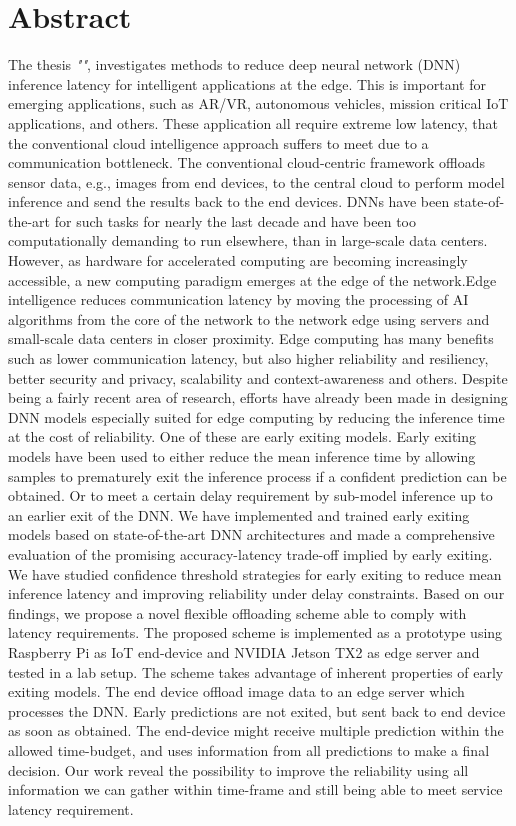 
    \hypertarget{abstract}{%
    \chapter*{Abstract}\label{sec:abstract}}
    \small{\textcolor{caption-color}{The thesis \textit{"\thetitle"}, investigates methods to reduce deep neural network (DNN) inference latency for intelligent applications at the edge. This is important for emerging applications, such as AR/VR, autonomous vehicles, mission critical IoT applications, and others. These application all require extreme low latency, that the conventional cloud intelligence approach suffers to meet due to a communication bottleneck. The conventional cloud-centric framework offloads sensor data, e.g., images from end devices, to the central cloud to perform model inference and send the results back to the end devices. DNNs have been state-of-the-art for such tasks for nearly the last decade and have been too computationally demanding to run elsewhere, than in large-scale data centers. However, as hardware for accelerated computing are becoming increasingly accessible, a new computing paradigm emerges at the edge of the network.\newline Edge intelligence reduces communication latency by moving the processing of AI algorithms from the core of the network to the network edge using servers and small-scale data centers in closer proximity. Edge computing has many benefits such as lower communication latency, but also higher reliability and resiliency, better security and privacy, scalability and context-awareness and others. Despite being a fairly recent area of research, efforts have already been made in designing DNN models especially suited for edge computing by reducing the inference time at the cost of reliability. One of these are early exiting models. \newline Early exiting models have been used to either reduce the mean inference time by allowing samples to prematurely exit the inference process if a confident prediction can be obtained. Or to meet a certain delay requirement by sub-model inference up to an earlier exit of the DNN. We have implemented and trained early exiting models based on state-of-the-art DNN architectures and made a comprehensive evaluation of the promising accuracy-latency trade-off implied by early exiting. We have studied confidence threshold strategies for early exiting to reduce mean inference latency and improving reliability under delay constraints. Based on our findings, we propose a novel flexible offloading scheme able to comply with latency requirements. The proposed scheme is implemented as a prototype using Raspberry Pi as IoT end-device and NVIDIA Jetson TX2 as edge server and tested in a lab setup. The scheme takes advantage of inherent properties of early exiting models. The end device offload image data to an edge server which processes the DNN. Early predictions are not exited, but sent back to end device as soon as obtained. The end-device might receive multiple prediction within the allowed time-budget, and uses information from all predictions to make a final decision. Our work reveal the possibility to improve the reliability using all information we can gather within time-frame and still being able to meet service latency requirement. }}